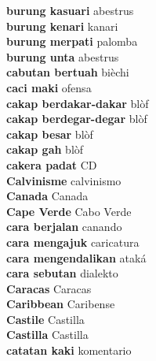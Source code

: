\textbf{ burung kasuari  } abestrus \\
\textbf{ burung kenari  } kanari \\
\textbf{ burung merpati  } palomba \\
\textbf{ burung unta  } abestrus \\
\textbf{ cabutan bertuah  } bièchi \\
\textbf{ caci maki  } ofensa \\
\textbf{ cakap berdakar-dakar  } blòf \\
\textbf{ cakap berdegar-degar  } blòf \\
\textbf{ cakap besar  } blòf \\
\textbf{ cakap gah  } blòf \\
\textbf{ cakera padat  } CD \\
\textbf{ Calvinisme  } calvinismo \\
\textbf{ Canada  } Canada \\
\textbf{ Cape Verde  } Cabo Verde \\
\textbf{ cara berjalan  } canando \\
\textbf{ cara mengajuk  } caricatura \\
\textbf{ cara mengendalikan  } ataká \\
\textbf{ cara sebutan  } dialekto \\
\textbf{ Caracas  } Caracas \\
\textbf{ Caribbean  } Caribense \\
\textbf{ Castile  } Castilla \\
\textbf{ Castilla  } Castilla \\
\textbf{ catatan kaki  } komentario \\
